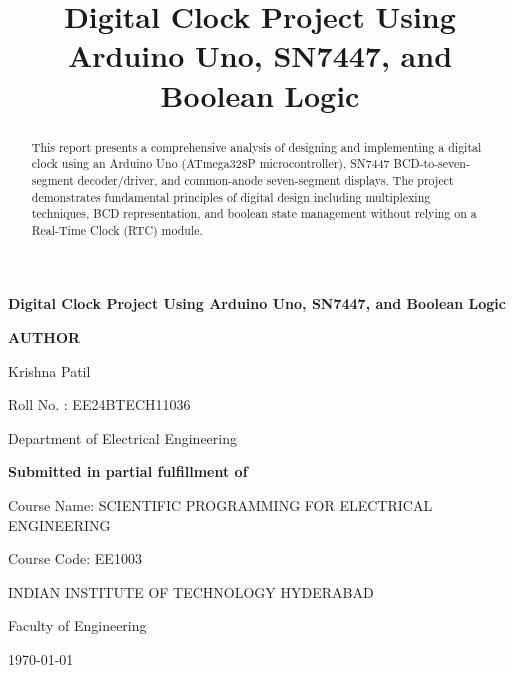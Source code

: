 \documentclass{article}
\title{Digital Clock Project Using Arduino Uno, SN7447, and Boolean Logic}
\author{}
\date{}
\begin{document}
\begin{titlepage}
    \centering
    
    {\Huge\bfseries Digital Clock Project Using Arduino Uno, SN7447, and Boolean Logic\par}
    \vspace{1.5cm}
    
    {\Large
    \textbf{AUTHOR}\par
    \vspace{0.5cm}
    Krishna Patil\par
    \vspace{0.3cm}
    Roll No. : EE24BTECH11036\par
    \vspace{0.3cm}
    Department of Electrical Engineering\par
    \vspace{1cm}
    
    \textbf{Submitted in partial fulfillment of}\par
    \vspace{0.3cm}
    Course Name: SCIENTIFIC PROGRAMMING FOR ELECTRICAL ENGINEERING\par
    Course Code: EE1003\par
    \vspace{1cm}
    
    INDIAN INSTITUTE OF TECHNOLOGY HYDERABAD\par
    Faculty of Engineering\par
    \vspace{1cm}
    
    \today\par
    }
    
    \vfill
    \begin{abstract}
    This report presents a comprehensive analysis of designing and implementing a digital clock using an Arduino Uno (ATmega328P microcontroller), SN7447 BCD-to-seven-segment decoder/driver, and common-anode seven-segment displays. The project demonstrates fundamental principles of digital design including multiplexing techniques, BCD representation, and boolean state management without relying on a Real-Time Clock (RTC) module.
    \end{abstract}
    
   
\end{titlepage}
\maketitle
\end{document}
